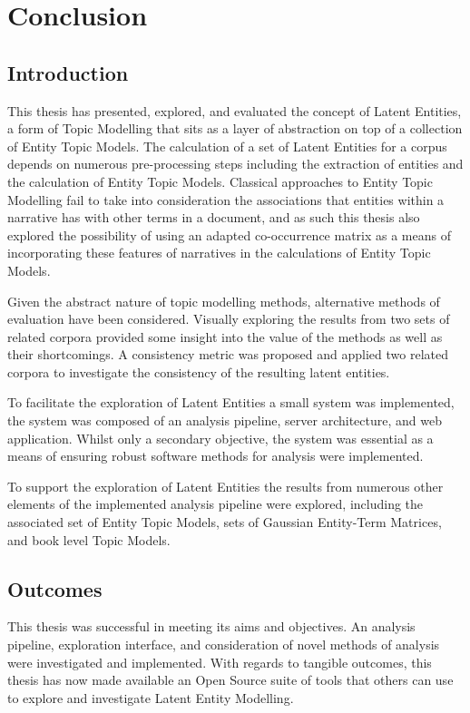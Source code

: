 \documentclass[10pt]{report}
\begin{document}
% 
%
%
%
\chapter{Conclusion}

\section{Introduction}
This thesis has presented, explored, and evaluated the concept of Latent Entities, a form of Topic Modelling that sits as a layer of abstraction on top of a collection of Entity Topic Models. The calculation of a set of Latent Entities for a corpus depends on numerous pre-processing steps including the extraction of entities and the calculation of Entity Topic Models. Classical approaches to Entity Topic Modelling fail to take into consideration the associations that entities within a narrative has with other terms in a document, and as such this thesis also explored the possibility of using an adapted co-occurrence matrix as a means of incorporating these features of narratives in the calculations of Entity Topic Models.

Given the abstract nature of topic modelling methods, alternative methods of evaluation have been considered. Visually exploring the results from two sets of related corpora provided some insight into the value of the methods as well as their shortcomings. A consistency metric was proposed and applied two related corpora to investigate the consistency of the resulting latent entities.

To facilitate the exploration of Latent Entities a small system was implemented, the system was composed of an analysis pipeline, server architecture, and web application. Whilst only a secondary objective, the system was essential as a means of ensuring robust software methods for analysis were implemented.

To support the exploration of Latent Entities the results from numerous other elements of the implemented analysis pipeline were explored, including the associated set of Entity Topic Models, sets of Gaussian Entity-Term Matrices, and book level Topic Models.

\section{Outcomes}
This thesis was successful in meeting its aims and objectives. An analysis pipeline, exploration interface, and consideration of novel methods of analysis were investigated and implemented. With regards to tangible outcomes, this thesis has now made available an Open Source suite of tools that others can use to explore and investigate Latent Entity Modelling.
\end{document}
